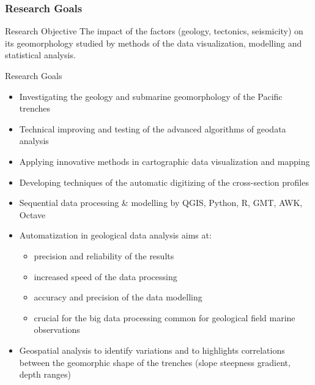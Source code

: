 \documentclass[pdflatex,compress,8pt,
	xcolor={dvipsnames,dvipsnames,svgnames,x11names,table},
	hyperref={colorlinks = true,breaklinks = true, urlcolor = NavyBlue, breaklinks = true}]{beamer}
\begin{document}
\begin{frame}\frametitle{Research Goals}
	\begin{exampleblock}{Research Objective}
The impact of the factors (geology, tectonics, seismicity) on its geomorphology studied by methods of the data visualization, modelling and statistical analysis.
	\end{exampleblock}

	\begin{alertblock}{Research Goals}
\begin{itemize}
 \item Investigating the geology and submarine geomorphology of the Pacific trenches
            \item Technical improving and testing of the advanced algorithms of geodata analysis
            \item Applying innovative methods in cartographic data visualization and mapping
            \item Developing techniques of the automatic digitizing of the cross-section profiles
            \item Sequential data processing \& modelling by QGIS, Python, R, GMT, AWK, Octave
             \item Automatization in geological data analysis aims at:
             	\begin{itemize}
            		\item precision and reliability of the results
			\item increased speed of the data processing
			\item accuracy and precision of the data modelling
			\item crucial for the big data processing common for geological field marine observations
		\end{itemize}
		\item Geospatial analysis to identify variations and to highlights correlations between the geomorphic shape of the trenches (slope steepness gradient, depth ranges)
\end{itemize}
	\end{alertblock}
\end{frame}
\end{document}
